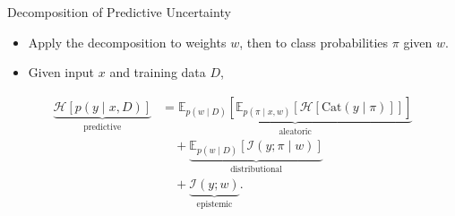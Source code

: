 \begin{frame}{Decomposition of Predictive Uncertainty}
\label{frm:backup-three-way-decomposition}
\begin{itemize}
\setlength{\itemsep}{4mm}
\item Apply the decomposition to weights $w$, then to class probabilities $\pi$ given $w$.
\item Given input $x$ and training data $D$,
\end{itemize}
\begin{align*}
\underbrace{\mathcal H[p(y\mid x,D)]}_{\text{predictive}}
&=\underbrace{\mathbb E_{p(w\mid D)}\!\left[
\mathbb E_{p(\pi\mid x,w)}\!\left[\mathcal H[\mathrm{Cat}(y\mid\pi)]\right]\right]}_{\text{aleatoric}}\\[4mm]
&\quad+\underbrace{\mathbb E_{p(w\mid D)}\!\left[\mathcal I(y;\pi\mid w)\right]}_{\text{distributional}}\\[4mm]
&\quad+\underbrace{\mathcal I(y;w)}_{\text{epistemic}}.
\end{align*}
\end{frame}

